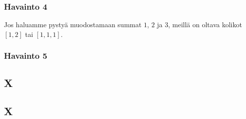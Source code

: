 \subsubsection{Havainto 4}

Jos haluamme pystyä muodostamaan summat $1$, $2$ ja $3$,
meillä on oltava kolikot $[1,2]$ tai $[1,1,1]$.

\subsubsection{Havainto 5}


\subsection{X}

\subsection{X}
